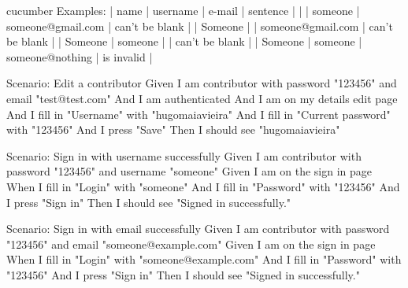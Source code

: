 \begin{mycode}{cucumber}
    Examples:
    | name    | username | e-mail            | sentence       |
    |         | someone  | someone@gmail.com | can't be blank |
    | Someone |          | someone@gmail.com | can't be blank |
    | Someone | someone  |                   | can't be blank |
    | Someone | someone  | someone@nothing   | is invalid     |

  Scenario: Edit a contributor
    Given I am contributor with password "123456" and email "test@test.com"
    And I am authenticated
    And I am on my details edit page
    And I fill in "Username" with "hugomaiavieira"
    And I fill in "Current password" with "123456"
    And I press "Save"
    Then I should see "hugomaiavieira"

  Scenario: Sign in with username successfully
    Given I am contributor with password "123456" and username "someone"
    Given I am on the sign in page
    When I fill in "Login" with "someone"
    And I fill in "Password" with "123456"
    And I press "Sign in"
    Then I should see "Signed in successfully."

  Scenario: Sign in with email successfully
    Given I am contributor with password "123456" and email "someone@example.com"
    Given I am on the sign in page
    When I fill in "Login" with "someone@example.com"
    And I fill in "Password" with "123456"
    And I press "Sign in"
    Then I should see "Signed in successfully."
\end{mycode}

